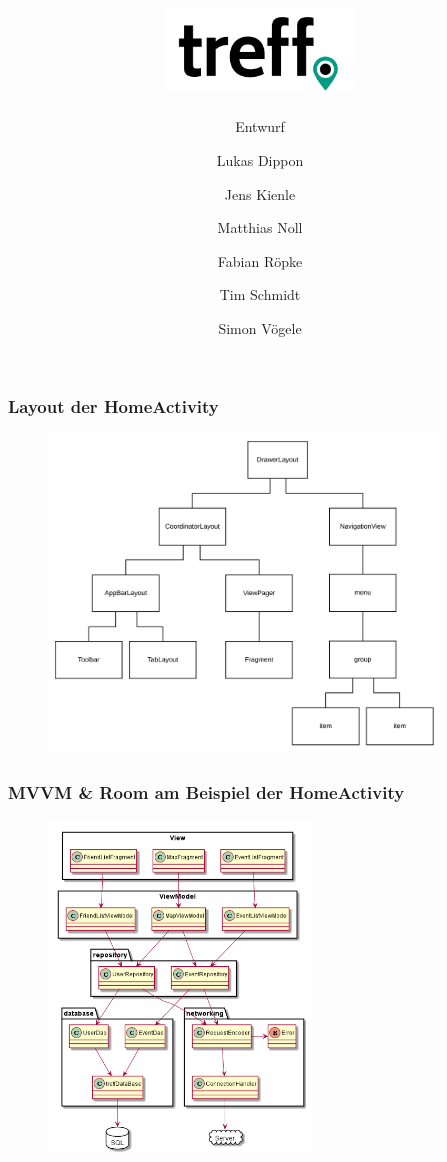 \documentclass[aspectratio=1610]{beamer}
\title{\includegraphics[width = 50mm]{images/logo_crop.png}}
\subtitle{\huge Entwurf}
\author{Lukas Dippon
	\and Jens Kienle
	\and Matthias Noll
	\and Fabian Röpke
	\and Tim Schmidt
	\and Simon Vögele}
\begin{document}
	\begin{frame}[plain]
	\maketitle
	\end{frame}


    \begin{frame}[plain]
        \frametitle{Layout der HomeActivity}
        \begin{figure}[!htb]
            \centering
            \includegraphics[height = 240pt]{images/activity-home-layout.png}
        \end{figure}
    \end{frame}

	\begin{frame}[plain]
        \frametitle{MVVM \& Room am Beispiel der HomeActivity}
        \begin{figure}[!htb]
            \centering
            \includegraphics[height = 250pt]{images/database.png}
        \end{figure}
	\end{frame}
\end{document}
